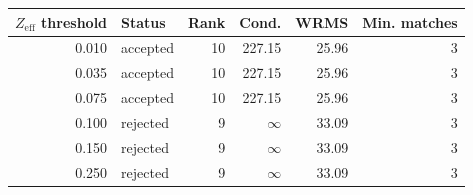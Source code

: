 \begin{tabular}{rlrrrr}
\toprule
$Z_\mathrm{eff}$ threshold & Status & Rank & Cond. & WRMS & Min. matches \\
\midrule
0.010 & accepted & 10 & 227.15 & 25.96 & 3 \\
0.035 & accepted & 10 & 227.15 & 25.96 & 3 \\
0.075 & accepted & 10 & 227.15 & 25.96 & 3 \\
0.100 & rejected & 9 & $\infty$ & 33.09 & 3 \\
0.150 & rejected & 9 & $\infty$ & 33.09 & 3 \\
0.250 & rejected & 9 & $\infty$ & 33.09 & 3 \\
\bottomrule
\end{tabular}
